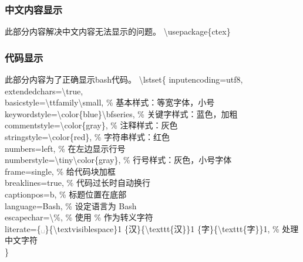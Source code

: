 \documentclass{article}
\begin{document}
		
	\subsubsection{中文内容显示}
	此部分内容解决中文内容无法显示的问题。
		\textbackslash usepackage\{ctex\}\\
		
	\subsubsection{代码显示}
	此部分内容为了正确显示bash代码。
		\textbackslash lstset\{
		inputencoding=utf8,\\
		extendedchars=\textbackslash true,\\
		basicstyle=\textbackslash ttfamily\textbackslash small, \% 基本样式：等宽字体，小号\\
		keywordstyle=\textbackslash color\{blue\}\textbackslash bfseries, \% 关键字样式：蓝色，加粗\\
		commentstyle=\textbackslash color\{gray\}, \% 注释样式：灰色\\
		stringstyle=\textbackslash color\{red\}, \% 字符串样式：红色\\
		numbers=left, \% 在左边显示行号\\
		numberstyle=\textbackslash tiny\textbackslash color\{gray\}, \% 行号样式：灰色，小号字体\\
		frame=single, \% 给代码块加框\\
		breaklines=true, \% 代码过长时自动换行\\
		captionpos=b, \% 标题位置在底部\\
		language=Bash, \% 设定语言为 Bash\\
		escapechar=\textbackslash\%, \% 使用 \% 作为转义字符\\
		literate=\{␣\}\{\textbackslash textvisiblespace\}1 \{汉\}\{\textbackslash texttt\{汉\}\}1 \{字\}\{\textbackslash texttt\{字\}\}1, \% 处理中文字符\\
		\}\\
		
\end{document}

